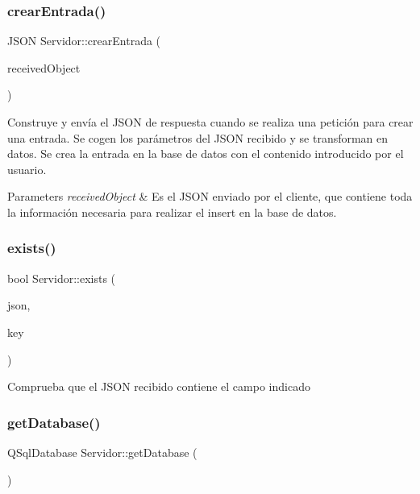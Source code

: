 \subsubsection{\texorpdfstring{crear\+Entrada()}{crearEntrada()}}
{\footnotesize\ttfamily J\+S\+ON Servidor\+::crear\+Entrada (\begin{DoxyParamCaption}\item[{J\+S\+ON}]{received\+Object }\end{DoxyParamCaption})}

Construye y envía el J\+S\+ON de respuesta cuando se realiza una petición para crear una entrada. Se cogen los parámetros del J\+S\+ON recibido y se transforman en datos. Se crea la entrada en la base de datos con el contenido introducido por el usuario. 
\begin{DoxyParams}{Parameters}
{\em received\+Object} & Es el J\+S\+ON enviado por el cliente, que contiene toda la información necesaria para realizar el insert en la base de datos. \\
\hline
\end{DoxyParams}
\mbox{\label{classServidor_a41f9f66959c43b27d1d13cf4f20eca55}} 
\subsubsection{\texorpdfstring{exists()}{exists()}}
{\footnotesize\ttfamily bool Servidor\+::exists (\begin{DoxyParamCaption}\item[{const J\+S\+ON \&}]{json,  }\item[{const std\+::string \&}]{key }\end{DoxyParamCaption})}

Comprueba que el J\+S\+ON recibido contiene el campo indicado \mbox{\label{classServidor_ae784cce9d89f9f9ca0804abdb9c3c9d7}} 
\subsubsection{\texorpdfstring{get\+Database()}{getDatabase()}}
{\footnotesize\ttfamily Q\+Sql\+Database Servidor\+::get\+Database (\begin{DoxyParamCaption}{ }\end{DoxyParamCaption})}

